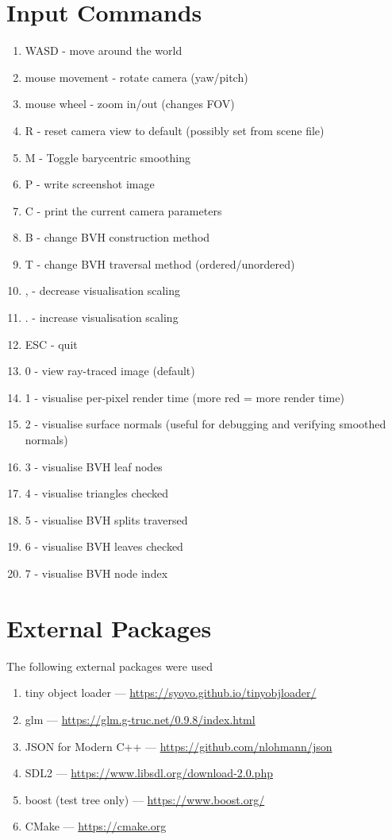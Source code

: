 \section{Input Commands}
    \begin{enumerate}
    \item WASD - move around the world
    \item mouse movement - rotate camera (yaw/pitch)
    \item mouse wheel - zoom in/out (changes FOV)
    \item R - reset camera view to default (possibly set from scene file)
    \item M - Toggle barycentric smoothing
    \item P - write screenshot image
    \item C - print the current camera parameters
    \item B - change BVH construction method
    \item T - change BVH traversal method (ordered/unordered)
    \item , - decrease visualisation scaling
    \item . - increase visualisation scaling
    \item ESC - quit
    \item 0 - view ray-traced image (default)
    \item 1 - visualise per-pixel render time (more red = more render time)
    \item 2 - visualise surface normals (useful for debugging and verifying smoothed normals)
    \item 3 - visualise BVH leaf nodes
    \item 4 - visualise triangles checked
    \item 5 - visualise BVH splits traversed
    \item 6 - visualise BVH leaves checked 
    \item 7 - visualise BVH node index
    \end{enumerate}

\section{External Packages}
The following external packages were used 
\begin{enumerate}
    \item tiny object loader --- \url{https://syoyo.github.io/tinyobjloader/}
    \item glm --- \url{https://glm.g-truc.net/0.9.8/index.html}
    \item JSON for Modern C++ --- \url{https://github.com/nlohmann/json}
    \item SDL2 --- \url{https://www.libsdl.org/download-2.0.php}
    \item boost (test tree only) --- \url{https://www.boost.org/}
    \item CMake --- \url{https://cmake.org}
\end{enumerate}

